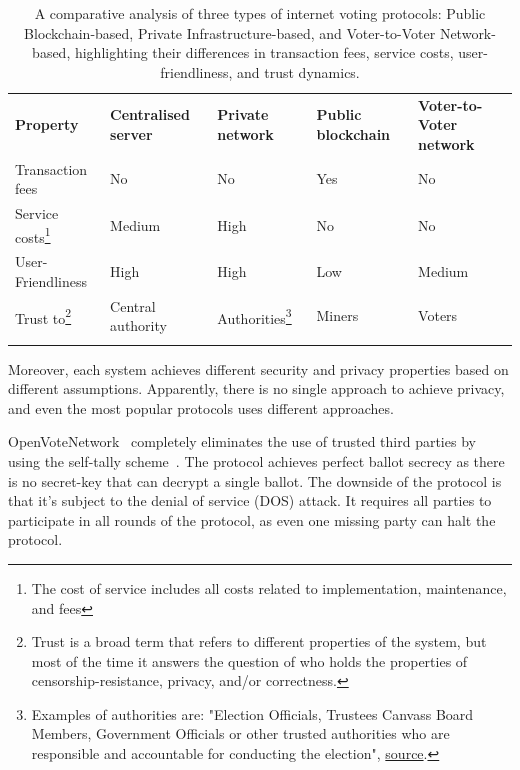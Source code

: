 \documentclass[runningheads]{llncs}
\begin{document}
\begin{table}[!h]
\label{table-comparision}
\centering
\newcommand{\YES}{\cellcolor{red!50}Yes}
\newcommand{\NO}{\cellcolor{green!50}No}
\caption{A comparative analysis of three types of internet voting protocols: Public Blockchain-based, Private Infrastructure-based, and Voter-to-Voter Network-based, highlighting their differences in transaction fees, service costs, user-friendliness, and trust dynamics.}
\begin{tabular}{p{}p{}p{}p{}p{}}
\noalign{\smallskip}\hline\noalign{\smallskip}
\textbf{Property} & \textbf{Centralised server} & \textbf{Private network} & \textbf{Public blockchain} & \textbf{Voter-to-Voter network}\\
\noalign{\smallskip}\hline\noalign{\smallskip}
Transaction fees & \NO & \NO & \YES & \NO \\
\hline
Service costs\footnote{The cost of service includes all costs related to implementation, maintenance, and fees} & \cellcolor{yellow!50} Medium & \cellcolor{red!50} High & \cellcolor{green!50} No  & \cellcolor{green!50} No \\
\hline
User-Friendliness & \cellcolor{green!50} High & \cellcolor{green!50}High & \cellcolor{red!50} Low & \cellcolor{yellow!50} Medium \\
\hline
Trust to\footnote{Trust is a broad term that refers to different properties of the system, but most of the time it answers the question of who holds the properties of censorship-resistance, privacy, and/or correctness.} & \cellcolor{red!50} Central authority & \cellcolor{yellow!50} Authorities\footnote{Examples of authorities are: "Election Officials, Trustees Canvass Board Members, Government Officials or other trusted authorities who are responsible and accountable for conducting the election", \href{http://www.electionguard.vote/basics/steps/1_Key_Ceremony/}{source}.} & \cellcolor{yellow!50} Miners & \cellcolor{yellow!50} Voters  \\
\noalign{\smallskip}\hline

\hline
\end{tabular}
\end{table}

Moreover, each system achieves different security and privacy properties based on different assumptions. Apparently, there is no single approach to achieve privacy, and even the most popular protocols uses different approaches.

OpenVoteNetwork~\cite{haoAnonymousVotingTworound2010,mccorrySmartContractBoardroom2017,seifelnasrScalableOpenVoteNetwork2020,elsheikhDisputefreeScalableOpen2022} completely eliminates the use of trusted third parties by using the self-tally scheme~\cite{kiayiasSelftallyingElectionsPerfect2002}. The protocol achieves perfect ballot secrecy as there is no secret-key that can decrypt a single ballot. The downside of the protocol is that it's subject to the denial of service (DOS) attack. It requires all parties to participate in all rounds of the protocol, as even one missing party can halt the protocol.
\end{document}
